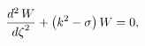 \[\frac{{d}^{2}\mathop{W\/}\nolimits}{{d\zeta}^{2}}+\left(k^{2}-\sigma\right)%
\mathop{W\/}\nolimits=0,\]